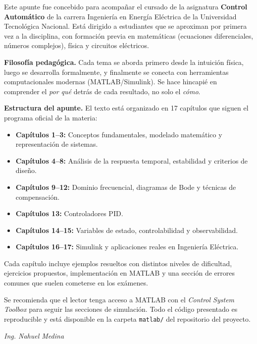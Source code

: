 \documentclass[12pt, a4paper, twoside, openany]{book}
\begin{document}
Este apunte fue concebido para acompañar el cursado de la asignatura
\textbf{Control Automático} de la carrera Ingeniería en Energía Eléctrica
de la Universidad Tecnológica Nacional. Está dirigido a estudiantes que
se aproximan por primera vez a la disciplina, con formación previa en
matemáticas (ecuaciones diferenciales, números complejos), física y
circuitos eléctricos.

\medskip
\textbf{Filosofía pedagógica.} Cada tema se aborda primero desde la
intuición física, luego se desarrolla formalmente, y finalmente se
conecta con herramientas computacionales modernas (MATLAB/Simulink).
Se hace hincapié en comprender el \textit{por qué} detrás de cada resultado,
no solo el \textit{cómo}.

\medskip
\textbf{Estructura del apunte.} El texto está organizado en 17 capítulos
que siguen el programa oficial de la materia:

\begin{itemize}
  \item \textbf{Capítulos 1--3:} Conceptos fundamentales, modelado matemático
        y representación de sistemas.
  \item \textbf{Capítulos 4--8:} Análisis de la respuesta temporal, estabilidad
        y criterios de diseño.
  \item \textbf{Capítulos 9--12:} Dominio frecuencial, diagramas de Bode y
        técnicas de compensación.
  \item \textbf{Capítulos 13:} Controladores PID.
  \item \textbf{Capítulos 14--15:} Variables de estado, controlabilidad y
        observabilidad.
  \item \textbf{Capítulos 16--17:} Simulink y aplicaciones reales en
        Ingeniería Eléctrica.
\end{itemize}

\medskip
Cada capítulo incluye ejemplos resueltos con distintos niveles de dificultad,
ejercicios propuestos, implementación en MATLAB y una sección de errores
comunes que suelen cometerse en los exámenes.

\medskip
Se recomienda que el lector tenga acceso a MATLAB con el
\textit{Control System Toolbox} para seguir las secciones de simulación.
Todo el código presentado es reproducible y está disponible en la carpeta
\texttt{matlab/} del repositorio del proyecto.

\begin{flushright}
  \textit{Ing. Nahuel Medina}
\end{flushright}
\end{document}
